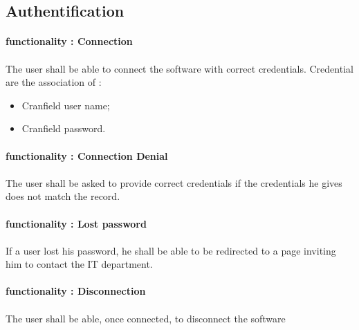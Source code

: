 


\subsection{Authentification}
 \paragraph{functionality  : Connection}\paragraph{}
 The user shall be able to connect the software with correct credentials. Credential are the association of : 
 \begin{itemize}
 	\item Cranfield user name;
 	\item Cranfield password.
 \end{itemize}
 
 
 
 \paragraph{functionality  : Connection Denial}\paragraph{}
 The user shall be asked to provide correct credentials if the credentials he gives does not match the record.


  \paragraph{functionality  : Lost password}\paragraph{}
  If a user lost his password, he shall be able to be redirected to a page inviting him to contact the IT department. 
 
  \paragraph{functionality  : Disconnection}\paragraph{}
  The user shall be able, once connected, to disconnect the software
  
  